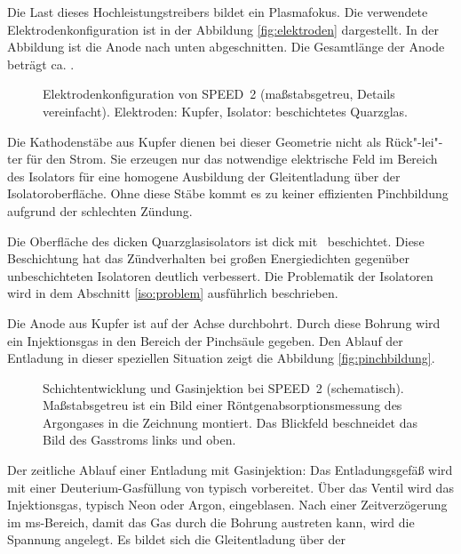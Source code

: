 %
Die Last dieses Hochleistungstreibers bildet ein Plasmafokus. Die verwendete
Elektrodenkonfiguration ist in der Abbildung \vref{fig:elektroden} dargestellt.
In der Abbildung ist die Anode nach unten abgeschnitten. Die Gesamtlänge der
Anode beträgt ca. .
%
\par
\begin{figure}[H]
  \center
  \caption{Elektrodenkonfiguration von SPEED~2 (maßstabsgetreu,
     Details vereinfacht). Elektroden: Kupfer, Isolator: \AlO beschichtetes
     Quarzglas.}
  \label{fig:elektroden}
\end{figure}
%
\par
Die Kathodenstäbe aus Kupfer dienen bei dieser Geometrie nicht als
Rück"-lei"-ter für den Strom. Sie erzeugen nur das notwendige
elektrische Feld im Bereich des Isolators für eine homogene
Ausbildung der Gleitentladung über der Isolatoroberfläche. Ohne
diese Stäbe kommt es zu keiner effizienten Pinchbildung aufgrund
der schlechten Zündung.
\par
Die Oberfläche des  dicken Quarzglasisolators ist
 dick mit \AlO\ beschichtet. Diese Beschichtung hat das
Zündverhalten bei großen Energiedichten gegenüber unbeschichteten
Isolatoren deutlich verbessert. Die Problematik der Isolatoren wird in
dem Abschnitt \vref{iso:problem} ausführlich beschrieben.
\par
Die Anode aus Kupfer ist auf der Achse durchbohrt. Durch diese
 Bohrung wird ein Injektionsgas in den Bereich der
Pinchsäule gegeben. Den Ablauf der Entladung in dieser speziellen
Situation zeigt die Abbildung \vref{fig:pinchbildung}.
%
\par
\begin{figure}[H]
  \center
  \caption{Schichtentwicklung und Gasinjektion bei SPEED~2 (schematisch).
  Maßstabsgetreu ist ein Bild einer Röntgenabsorptionsmessung
  des Argongases in die Zeichnung montiert. Das Blickfeld beschneidet das
  Bild des Gasstroms links und oben.}
  \label{fig:pinchbildung}
\end{figure}
%
\par
Der zeitliche Ablauf einer Entladung mit Gasinjektion: Das
Entladungsgefäß wird mit einer Deuterium-Gasfüllung von typisch
 vorbereitet. Über das Ventil wird das Injektionsgas,
typisch Neon oder Argon, eingeblasen. Nach einer Zeitverzögerung im
ms-Bereich, damit das Gas durch die Bohrung austreten kann, wird die
Spannung angelegt. Es bildet sich die Gleitentladung über der
